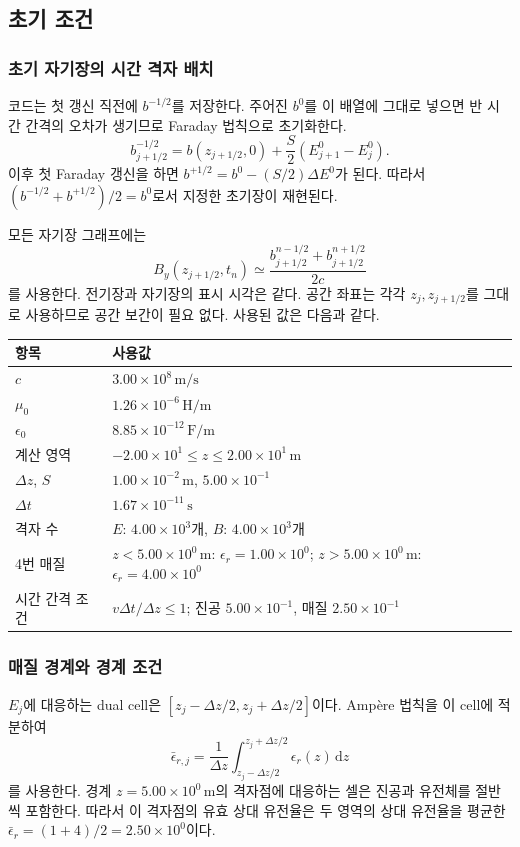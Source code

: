 \documentclass[11pt,a4paper]{article}
\newcommand{\dd}{\mathrm{d}}\newcommand{\ee}{\mathrm{e}}
\newcommand{\unit}[1]{\,\mathrm{#1}}
\newcommand{\sci}[2]{\mathord{#1\times10^{#2}}}
\begin{document}
\newpage
\subsection{초기 조건}
\subsubsection{초기 자기장의 시간 격자 배치}
코드는 첫 갱신 직전에 $b^{-1/2}$를 저장한다. 주어진 $b^0$를 이 배열에
그대로 넣으면 반 시간 간격의 오차가 생기므로 Faraday 법칙으로 초기화한다.
\begin{equation}
 b_{j+1/2}^{-1/2}=b(z_{j+1/2},0)+\frac{S}{2}(E_{j+1}^{0}-E_j^{0}).
 \label{eq:init}
\end{equation}
이후 첫 Faraday 갱신을 하면 $b^{+1/2}=b^0-(S/2)\Delta E^0$가 된다.
따라서 $(b^{-1/2}+b^{+1/2})/2=b^0$로서 지정한 초기장이 재현된다.

모든 자기장 그래프에는
\begin{equation}
 B_y(z_{j+1/2},t_n)\simeq
 \frac{b_{j+1/2}^{n-1/2}+b_{j+1/2}^{n+1/2}}{2c}
 \label{eq:sync}
\end{equation}
를 사용한다. 전기장과 자기장의 표시 시각은 같다. 공간 좌표는 각각
$z_j,z_{j+1/2}$를 그대로 사용하므로 공간 보간이 필요 없다.
사용된 값은 다음과 같다.
\begin{center}\small\renewcommand{\arraystretch}{1.22}
\begin{tabular}{ll}\toprule
항목 & 사용값\\\midrule
$c$ & $\sci{3.00}{8}\unit{m/s}$\\
$\mu_0$ & $\sci{1.26}{-6}\unit{H/m}$\\
$\epsilon_0$ & $\sci{8.85}{-12}\unit{F/m}$\\
계산 영역 & $\sci{-2.00}{1}\le z\le\sci{2.00}{1}\unit m$\\
$\Delta z$, $S$ & $\sci{1.00}{-2}\unit m$, $\sci{5.00}{-1}$\\
$\Delta t$ & $\sci{1.67}{-11}\unit s$\\
격자 수 & $E$: $\sci{4.00}{3}$개, $B$: $\sci{4.00}{3}$개\\
4번 매질 & $z<\sci{5.00}{0}\unit m$: $\epsilon_r=\sci{1.00}{0}$; $z>\sci{5.00}{0}\unit m$: $\epsilon_r=\sci{4.00}{0}$\\
시간 간격 조건 & $v\Delta t/\Delta z\le1$; 진공 $\sci{5.00}{-1}$, 매질 $\sci{2.50}{-1}$\\\bottomrule
\end{tabular}\end{center}

\subsubsection{매질 경계와 경계 조건}
$E_j$에 대응하는 dual cell은 $[z_j-\Delta z/2,z_j+\Delta z/2]$이다.
Ampère 법칙을 이 cell에 적분하여
\begin{equation}
 \bar\epsilon_{r,j}=\frac{1}{\Delta z}
 \int_{z_j-\Delta z/2}^{z_j+\Delta z/2}\epsilon_r(z)\,\dd z
\end{equation}
를 사용한다. 경계 $z=\sci{5.00}{0}\unit m$의 격자점에 대응하는 셀은
진공과 유전체를 절반씩 포함한다. 따라서 이 격자점의 유효 상대 유전율은
두 영역의 상대 유전율을 평균한 $\bar\epsilon_r=(1+4)/2=\sci{2.50}{0}$이다.
\end{document}
